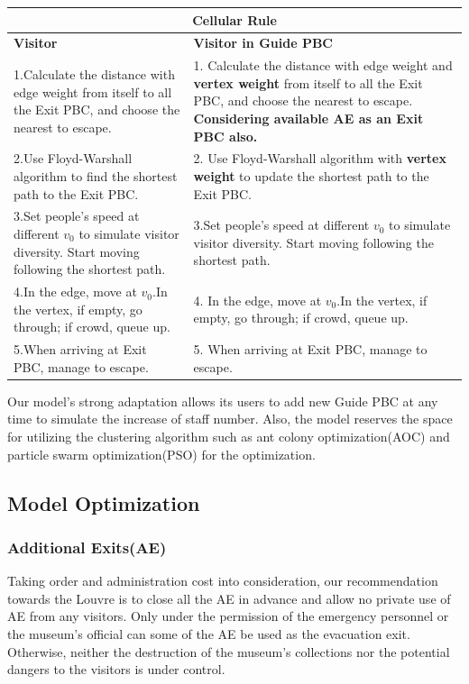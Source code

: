 \documentclass[12pt]{article}
\begin{document}
\renewcommand\arraystretch{1.5}
\begin{tabular}{p{17em}|p{17em}}
    \hline
    \multicolumn{2}{c}{\textbf{\large{Cellular Rule}}} \\ \hline
	\textbf{Visitor} & \textbf{Visitor in Guide PBC} \\ \hline
1.Calculate the distance with edge weight from itself to all the Exit PBC, and choose the nearest to escape. & 1.	Calculate the distance with edge weight and \textbf{vertex weight} from itself to all the Exit PBC, and choose the nearest to escape. \textbf{Considering available AE as an Exit PBC also.} \\ \hline
2.Use Floyd-Warshall algorithm to find the shortest path to the Exit PBC. & 2.	Use Floyd-Warshall algorithm with \textbf{vertex weight} to update the shortest path to the Exit PBC. \\ \hline
3.Set people's speed at different $v_{0}$ to simulate visitor diversity. Start moving following the shortest path. & 3.Set people's speed at different $v_{0}$ to simulate visitor diversity. 	Start moving following the shortest path. \\ \hline
4.In the edge, move at $v_{0}$.In the vertex, if empty, go through; if crowd, queue up. & 4.	In the edge, move at $v_{0}$.In the vertex, if empty, go through; if crowd, queue up. \\ \hline
5.When arriving at Exit PBC, manage to escape. & 5. When arriving at Exit PBC, manage to escape. \\ \hline
\end{tabular}

Our model's strong adaptation allows its users to add new Guide PBC at any time to simulate the increase of staff number. Also, the model reserves the space for utilizing the clustering algorithm such as ant colony optimization(AOC) and particle swarm optimization(PSO) for the optimization.

\subsection{Model Optimization}
\subsubsection{Additional Exits(AE)}
Taking order and administration cost into consideration, our 
recommendation towards the Louvre is to close all the AE in 
advance and allow no private use of AE from any visitors. Only 
under the permission of the emergency personnel or the museum's 
official can some of the AE be used as the evacuation exit. 
Otherwise, neither the destruction of the museum's collections nor 
the potential dangers to the visitors is under control. 
\end{document}
